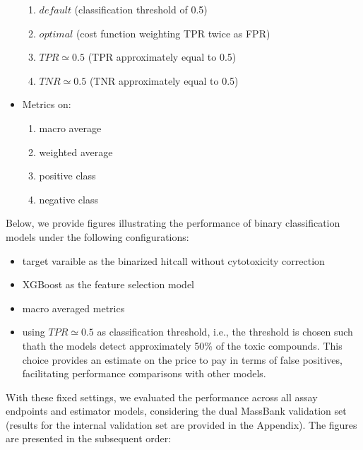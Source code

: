 \begin{itemize}
\begin{enumerate}
      \item $default$  (classification threshold of 0.5)
      \item $optimal$ (cost function weighting TPR twice as FPR)
      \item $TPR \simeq 0.5$ (TPR approximately equal to 0.5)
      \item $TNR \simeq 0.5$ (TNR approximately equal to 0.5)
    \end{enumerate}
  \item Metrics on:
    \begin{enumerate}
      \item macro average
      \item weighted average
      \item positive class
      \item negative class
    \end{enumerate}
\end{itemize}


Below, we provide figures illustrating the performance of binary classification models under the following configurations:
\begin{itemize}
  \item target varaible as the binarized hitcall without cytotoxicity correction
  \item XGBoost as the feature selection model
  \item macro averaged metrics
  \item using $TPR \simeq 0.5 $ as classification threshold, i.e., the threshold is chosen such thath the models detect approximately 50\% of the toxic compounds. This choice provides an estimate on the price to pay in terms of false positives, facilitating performance comparisons with other models.
\end{itemize}

With these fixed settings, we evaluated the performance across all assay endpoints and estimator models, considering the dual MassBank validation set (results for the internal validation set are provided in the Appendix). The figures are presented in the subsequent order:

